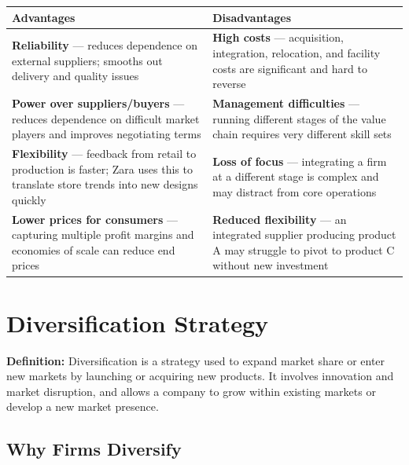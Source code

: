 \documentclass[11pt, letterpaper]{article}
\begin{document}
\begin{center}
\begin{tabular}{p{6.5cm} p{6.5cm}}
\toprule
\textbf{Advantages} & \textbf{Disadvantages} \\
\midrule
\textbf{Reliability} --- reduces dependence on external suppliers; smooths out delivery and quality issues & \textbf{High costs} --- acquisition, integration, relocation, and facility costs are significant and hard to reverse \\
\addlinespace
\textbf{Power over suppliers/buyers} --- reduces dependence on difficult market players and improves negotiating terms & \textbf{Management difficulties} --- running different stages of the value chain requires very different skill sets \\
\addlinespace
\textbf{Flexibility} --- feedback from retail to production is faster; Zara uses this to translate store trends into new designs quickly & \textbf{Loss of focus} --- integrating a firm at a different stage is complex and may distract from core operations \\
\addlinespace
\textbf{Lower prices for consumers} --- capturing multiple profit margins and economies of scale can reduce end prices & \textbf{Reduced flexibility} --- an integrated supplier producing product A may struggle to pivot to product C without new investment \\
\bottomrule
\end{tabular}
\end{center}

\newpage

\section{Diversification Strategy}

\begin{defbox}
\textbf{Definition:} Diversification is a strategy used to expand market share or enter new markets by launching or acquiring new products. It involves innovation and market disruption, and allows a company to grow within existing markets or develop a new market presence.
\end{defbox}

\subsection{Why Firms Diversify}
\end{document}

